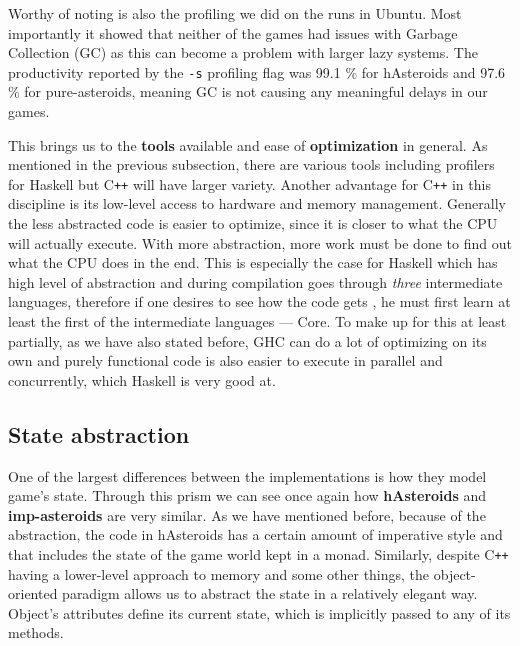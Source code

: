 \documentclass[
  digital, %
  color,   %
  table,   %
  oneside, %
  lof,     %
  lot,     %
]{fithesis3}
\newcommand{\cpp}{C\nolinebreak\texttt{+}\nolinebreak\texttt{+}}
\begin{document}
{Worthy of noting is also the profiling we did on the runs in Ubuntu.
Most importantly it showed that neither of the games had issues with Garbage Collection (GC)
as this can become a problem with larger lazy systems.
The productivity reported by the \texttt{-s} profiling flag was 99.1 \%
for hAsteroids and 97.6 \% for pure-asteroids,
meaning GC is not causing any meaningful delays in our games.

This brings us to the \textbf{tools} available and ease of \textbf{optimization} in general.
As mentioned in the previous subsection, there are various tools including
profilers for Haskell but \cpp{} will have larger variety. Another advantage
for \cpp{} in this discipline is its low-level access to hardware and memory management.
Generally the less abstracted code is easier to optimize, since it is closer to
what the CPU will actually execute. With more abstraction, more work must be
done to find out what the CPU does in the end. This is especially the case for Haskell
which has high level of abstraction and during compilation goes through \emph{three} intermediate
languages, therefore if one desires to see how the code gets , he must
first learn at least the first of the intermediate languages --- Core.
To make up for this at least partially, as we have also stated before,
GHC can do a lot of optimizing on its own and purely functional code is also easier
to execute in parallel and concurrently, which Haskell is very good at.



\subsection{State abstraction}
\label{sect:stateabstraction}
One of the largest differences between the implementations is how they model game's state.
Through this prism we can see once again how \textbf{hAsteroids} and \textbf{imp-asteroids}
are very similar. As we have mentioned before, because of the abstraction,
the code in hAsteroids has a certain amount of imperative style and that includes the state
of the game world kept in a monad. Similarly, despite \cpp{} having a lower-level
approach to memory and some other things, the object-oriented paradigm allows us
to abstract the state in a relatively elegant way. Object's attributes
define its current state, which is implicitly passed to any of its methods.

}
\end{document}
